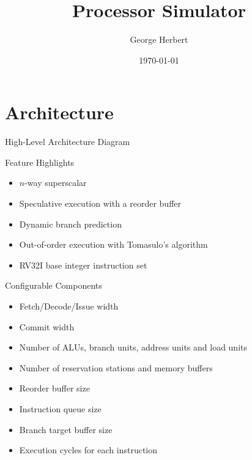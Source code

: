\documentclass{beamer}
\title{Processor Simulator}
\author{George Herbert}
\date{\today}
\begin{document}
\begin{frame}
    \titlepage
\end{frame}

\section{Architecture}
\begin{frame}{High-Level Architecture Diagram}
\end{frame}

\begin{frame}{Feature Highlights}
    \begin{itemize}
        \item $n$-way superscalar        
        \item Speculative execution with a reorder buffer
        \item Dynamic branch prediction
        \item Out-of-order execution with Tomasulo's algorithm
        \item RV32I base integer instruction set
    \end{itemize}
\end{frame}

\begin{frame}{Configurable Components}
    \begin{itemize}
        \item Fetch/Decode/Issue width
        \item Commit width
        \item Number of ALUs, branch units, address units and load units
        \item Number of reservation stations and memory buffers
        \item Reorder buffer size
        \item Instruction queue size
        \item Branch target buffer size
        \item Execution cycles for each instruction
    \end{itemize}
\end{frame}
\end{document}
